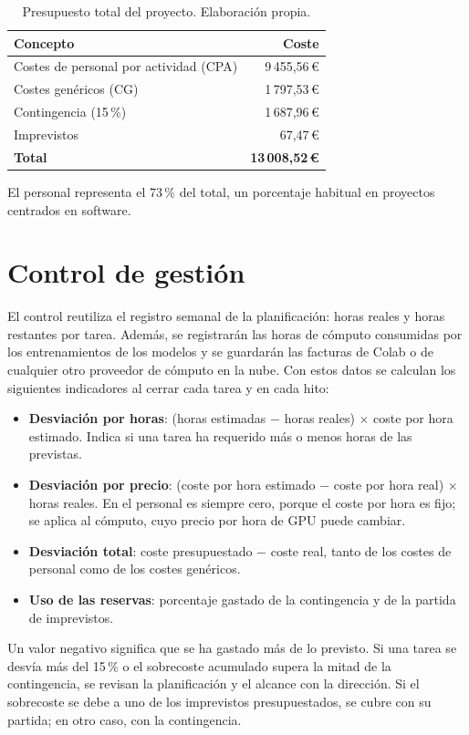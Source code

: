 \begin{table}[H]
  \centering
  \small
  \begin{tabular}{lr}
    \toprule
    \textbf{Concepto} & \textbf{Coste} \\
    \midrule
    Costes de personal por actividad (CPA) & 9\,455,56\,€ \\
    Costes genéricos (CG) & 1\,797,53\,€ \\
    Contingencia (15\,\%) & 1\,687,96\,€ \\
    Imprevistos & 67,47\,€ \\
    \midrule
    \textbf{Total} & \textbf{13\,008,52\,€} \\
    \bottomrule
  \end{tabular}
  \caption[Presupuesto total]{Presupuesto total del proyecto. Elaboración
  propia.}
  \label{tab:presupuesto-total}
\end{table}

El personal representa el 73\,\% del total, un porcentaje habitual en
proyectos centrados en software.

\section{Control de gestión}
\label{sec:control-gestion}

El control reutiliza el registro semanal de la planificación: horas reales y
horas restantes por tarea. Además, se registrarán las horas de cómputo
consumidas por los entrenamientos de los modelos y se guardarán las facturas de
Colab o de cualquier otro proveedor de cómputo en la nube. Con estos datos se
calculan los siguientes indicadores al cerrar cada tarea y en cada hito:

\begin{itemize}
  \item \textbf{Desviación por horas}: (horas estimadas $-$ horas reales)
  $\times$ coste por hora estimado. Indica si una tarea ha requerido más o
  menos horas de las previstas.
  \item \textbf{Desviación por precio}: (coste por hora estimado $-$ coste por
  hora real) $\times$ horas reales. En el personal es siempre cero, porque el
  coste por hora es fijo; se aplica al cómputo, cuyo precio por hora de GPU
  puede cambiar.
  \item \textbf{Desviación total}: coste presupuestado $-$ coste real, tanto de
  los costes de personal como de los costes genéricos.
  \item \textbf{Uso de las reservas}: porcentaje gastado de la contingencia y
  de la partida de imprevistos.
\end{itemize}

Un valor negativo significa que se ha gastado más de lo previsto. Si una tarea
se desvía más del 15\,\% o el sobrecoste acumulado supera la mitad de la
contingencia, se revisan la planificación y el alcance con la dirección. Si el
sobrecoste se debe a uno de los imprevistos presupuestados, se cubre con su partida; en otro
caso, con la contingencia.

\endgroup
